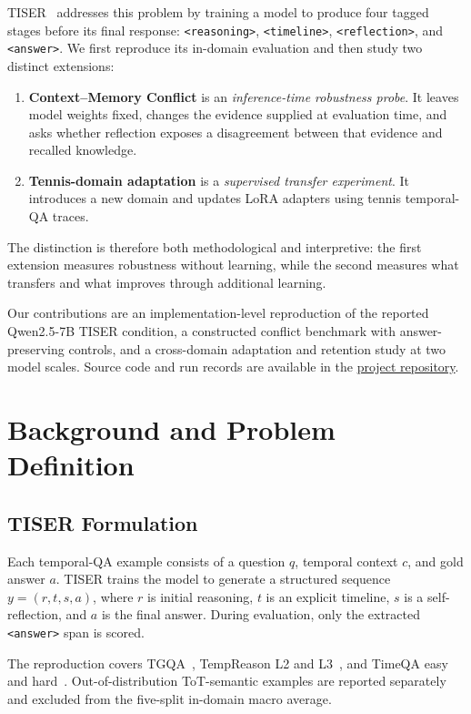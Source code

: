 \documentclass[conference]{IEEEtran}
\begin{document}
TISER~\cite{bazaga2025tiser} addresses this problem by training a model to produce four tagged stages before its final response: \texttt{<reasoning>}, \texttt{<timeline>}, \texttt{<reflection>}, and \texttt{<answer>}. We first reproduce its in-domain evaluation and then study two distinct extensions:
\begin{enumerate}
\item \textbf{Context--Memory Conflict} is an \emph{inference-time robustness probe}. It leaves model weights fixed, changes the evidence supplied at evaluation time, and asks whether reflection exposes a disagreement between that evidence and recalled knowledge.
\item \textbf{Tennis-domain adaptation} is a \emph{supervised transfer experiment}. It introduces a new domain and updates LoRA adapters using tennis temporal-QA traces.
\end{enumerate}
The distinction is therefore both methodological and interpretive: the first extension measures robustness without learning, while the second measures what transfers and what improves through additional learning.

Our contributions are an implementation-level reproduction of the reported Qwen2.5-7B TISER condition, a constructed conflict benchmark with answer-preserving controls, and a cross-domain adaptation and retention study at two model scales. Source code and run records are available in the \href{https://github.com/thestbobo/tiser_temporal_reasoning_extension}{project repository}.

\section{Background and Problem Definition}

\subsection{TISER Formulation}

Each temporal-QA example consists of a question $q$, temporal context $c$, and gold answer $a$. TISER trains the model to generate a structured sequence $y=(r,t,s,a)$, where $r$ is initial reasoning, $t$ is an explicit timeline, $s$ is a self-reflection, and $a$ is the final answer. During evaluation, only the extracted \texttt{<answer>} span is scored.

The reproduction covers TGQA~\cite{xiong2024tgqa}, TempReason L2 and L3~\cite{tan2023tempreason}, and TimeQA easy and hard~\cite{chen2021timeqa}. Out-of-distribution ToT-semantic examples are reported separately and excluded from the five-split in-domain macro average.
\end{document}
